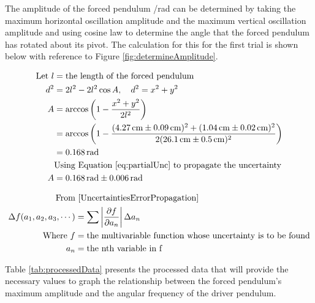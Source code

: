\documentclass[letterpaper, 12pt]{article}
\begin{document}
The amplitude of the forced pendulum /\unit{rad} can be determined
by taking the maximum horizontal oscillation amplitude
and the maximum vertical oscillation amplitude
and using cosine law to determine the angle
that the forced pendulum has rotated about its
pivot. The calculation for this for the first
trial is shown below with reference to Figure \ref*{fig:determineAmplitude}.

\begin{align*}
    \text{Let } l & = \text{the length of the forced pendulum }
    \\
    d^2           & = 2l^2 - 2l^2\cos A,\quad d^2 = x^2 + y^2
    \\
    A             & = \arccos \left( 1 - \frac{x^2 + y^2}{2l^2} \right)
    \\
                  & = \arccos \left( 1 - \frac{( \SI{4.27}{cm} \pm \SI{0.09}{cm} )^2 + (\SI{1.04}{cm} \pm \SI{0.02}{cm})^2}{2(\SI{26.1}{cm} \pm \SI{0.5}{cm})^2 } \right)
    \\
                  & = \SI{0.168}{rad}
    \\
                  & \text{Using Equation \ref*{eq:partialUnc} to propagate the uncertainty}
    \\
    A             & = \SI{0.168}{rad} \pm \SI{0.006}{rad}
\end{align*}

\begin{align}
    \text{From}                     & \text{ \cite{UncertaintiesErrorPropagation}} \nonumber
    \\
    \Delta f(a_1, a_2, a_3, \cdots) & = \sum \left| \pdv{f}{a_n} \right| \Delta a_n \label{eq:partialUnc}
    \\
    \text{Where } f                 & = \text{the multivariable function whose uncertainty is to be found} \nonumber
    \\
    a_n                             & = \text{the nth variable in f} \nonumber
\end{align}

Table \ref*{tab:processedData} presents the processed data
that will provide the necessary values to graph the
relationship between the forced pendulum's maximum
amplitude and the angular frequency of the driver
pendulum.
\end{document}
